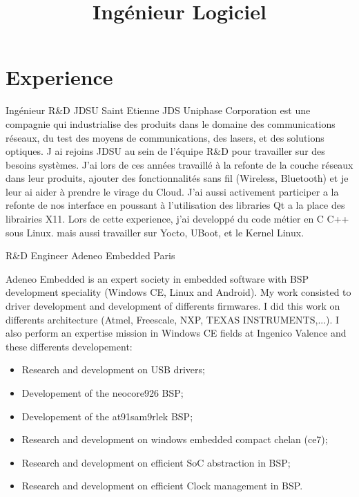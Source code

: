\documentclass[11pt,a4paper,sans]{moderncv}
\title{Ing\'enieur Logiciel}
\begin{document}
\makecvtitle

\section{Experience}

{Ing\'enieur R\&D}
{JDSU}
{Saint Etienne}
{}
{JDS Uniphase Corporation est une compagnie qui industrialise des produits
dans le domaine des communications r\'eseaux, du test des moyens de
communications, des lasers, et des solutions optiques.
J ai rejoins JDSU au sein de l'\'equipe R\&D pour travailler sur des besoins
syst\`emes. J'ai lors de ces ann\'ees travaill\'e \`a la refonte de la couche
r\'eseaux dans leur produits, ajouter des fonctionnalit\'es sans fil
(Wireless, Bluetooth) et je leur ai aider \`a prendre le virage du Cloud.
J'ai aussi activement participer a la refonte de nos interface en poussant
\`a l'utilisation des libraries Qt a la place des librairies X11.
Lors de cette experience, j'ai developp\'e du code m\'etier en C C++ sous
Linux. mais aussi travailler sur Yocto, UBoot, et le Kernel Linux.
}

{R\&D Engineer}
{Adeneo Embedded}
{Paris}
{}
{Adeneo Embedded is an expert society in embedded software with BSP
development speciality (Windows CE, Linux and Android).
My work consisted to driver development and development of differents
firmwares. I did this work on differents architecture (Atmel, Freescale,
NXP, TEXAS INSTRUMENTS,...).
I also perform an expertise mission in Windows CE fields at Ingenico
Valence and these differents developement:
\begin{itemize}
\item Research and development on USB drivers;
\item Developement of the neocore926 BSP;
\item Developement of the at91sam9rlek BSP;
\item Research and development on windows embedded compact chelan (ce7);
\item Research and development on efficient SoC abstraction in BSP;
\item Research and development on efficient Clock management in BSP.
\end{itemize}
}
\end{document}
